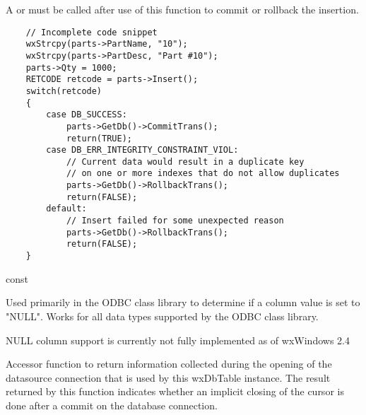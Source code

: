 
A  or 
 must be called after use of 
this function to commit or rollback the insertion.


\begin{verbatim}
    // Incomplete code snippet
    wxStrcpy(parts->PartName, "10");
    wxStrcpy(parts->PartDesc, "Part #10");
    parts->Qty = 1000;
    RETCODE retcode = parts->Insert();
    switch(retcode)
    {
        case DB_SUCCESS:
            parts->GetDb()->CommitTrans();
            return(TRUE);
        case DB_ERR_INTEGRITY_CONSTRAINT_VIOL:
            // Current data would result in a duplicate key
            // on one or more indexes that do not allow duplicates
            parts->GetDb()->RollbackTrans();
            return(FALSE);
        default:
            // Insert failed for some unexpected reason
            parts->GetDb()->RollbackTrans();
            return(FALSE);
    }
\end{verbatim}


\label{wxdbtableiscolnull}

 const

Used primarily in the ODBC class library to determine if a column value is 
set to "NULL".  Works for all data types supported by the ODBC class library.




NULL column support is currently not fully implemented as of wxWindows 2.4


\label{wxdbtableiscursorclosedoncommit}


Accessor function to return information collected during the opening of the 
datasource connection that is used by this wxDbTable instance.  The result 
returned by this function indicates whether an implicit closing of the cursor is 
done after a commit on the database connection.

